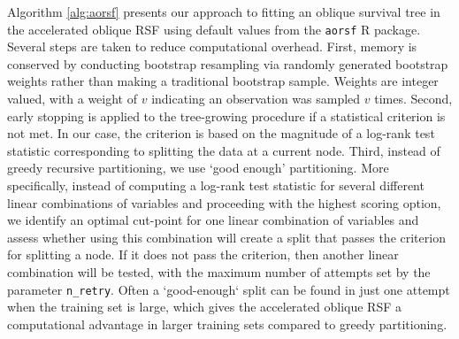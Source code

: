 \documentclass{article}\usepackage[]{graphicx}\usepackage[]{xcolor}
\begin{document}
Algorithm \ref{alg:aorsf} presents our approach to fitting an oblique survival tree in the accelerated oblique RSF using default values from the \texttt{aorsf} R package. Several steps are taken to reduce computational overhead. First, memory is conserved by conducting bootstrap resampling via randomly generated bootstrap weights rather than making a traditional bootstrap sample. Weights are integer valued, with a weight of $v$ indicating an observation was sampled $v$ times. Second, early stopping is applied to the tree-growing procedure if a statistical criterion is not met. In our case, the criterion is based on the magnitude of a log-rank test statistic corresponding to splitting the data at a current node. Third, instead of greedy recursive partitioning, we use `good enough' partitioning. More specifically, instead of computing a log-rank test statistic for several different linear combinations of variables and proceeding with the highest scoring option, we identify an optimal cut-point for one linear combination of variables and assess whether using this combination will create a split that passes the criterion for splitting a node. If it does not pass the criterion, then another linear combination will be tested, with the maximum number of attempts set by the parameter \texttt{n\_retry}. Often a `good-enough` split can be found in just one attempt when the training set is large, which gives the accelerated oblique RSF a computational advantage in larger training sets compared to greedy partitioning.
\end{document}
